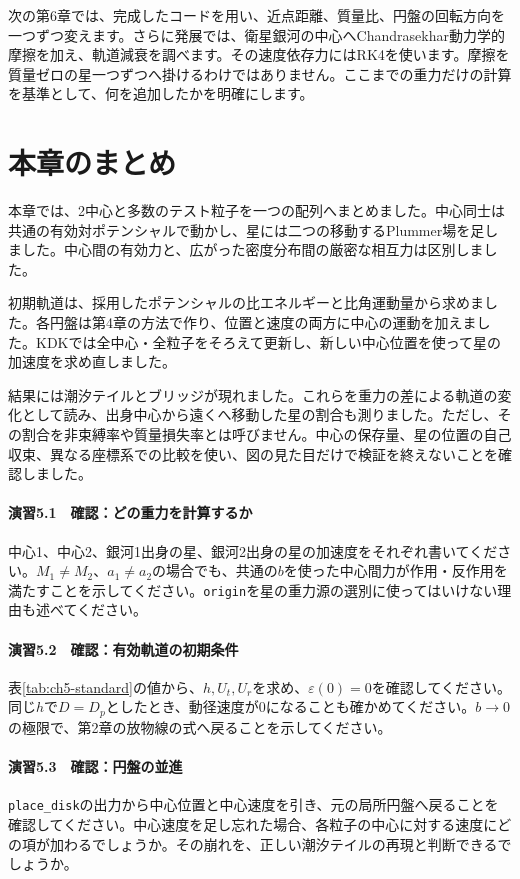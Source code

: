 次の第6章では、完成したコードを用い、近点距離、質量比、円盤の回転方向を一つずつ変えます。さらに発展では、衛星銀河の中心へChandrasekhar動力学的摩擦を加え、軌道減衰を調べます。その速度依存力にはRK4を使います。摩擦を質量ゼロの星一つずつへ掛けるわけではありません。ここまでの重力だけの計算を基準として、何を追加したかを明確にします。

\section{本章のまとめ}
本章では、2中心と多数のテスト粒子を一つの配列へまとめました。中心同士は共通の有効対ポテンシャルで動かし、星には二つの移動するPlummer場を足しました。中心間の有効力と、広がった密度分布間の厳密な相互力は区別しました。

初期軌道は、採用したポテンシャルの比エネルギーと比角運動量から求めました。各円盤は第4章の方法で作り、位置と速度の両方に中心の運動を加えました。KDKでは全中心・全粒子をそろえて更新し、新しい中心位置を使って星の加速度を求め直しました。

結果には潮汐テイルとブリッジが現れました。これらを重力の差による軌道の変化として読み、出身中心から遠くへ移動した星の割合も測りました。ただし、その割合を非束縛率や質量損失率とは呼びません。中心の保存量、星の位置の自己収束、異なる座標系での比較を使い、図の見た目だけで検証を終えないことを確認しました。

\chapterexercises
\paragraph{演習5.1　確認：どの重力を計算するか}
中心1、中心2、銀河1出身の星、銀河2出身の星の加速度をそれぞれ書いてください。$M_1\ne M_2$、$a_1\ne a_2$の場合でも、共通の$b$を使った中心間力が作用・反作用を満たすことを示してください。\texttt{origin}を星の重力源の選別に使ってはいけない理由も述べてください。

\paragraph{演習5.2　確認：有効軌道の初期条件}
表\ref{tab:ch5-standard}の値から、$h,U_t,U_r$を求め、$\varepsilon(0)=0$を確認してください。同じ$h$で$D=D_p$としたとき、動径速度が0になることも確かめてください。$b\to0$の極限で、第2章の放物線の式へ戻ることを示してください。

\paragraph{演習5.3　確認：円盤の並進}
\texttt{place\_disk}の出力から中心位置と中心速度を引き、元の局所円盤へ戻ることを確認してください。中心速度を足し忘れた場合、各粒子の中心に対する速度にどの項が加わるでしょうか。その崩れを、正しい潮汐テイルの再現と判断できるでしょうか。

